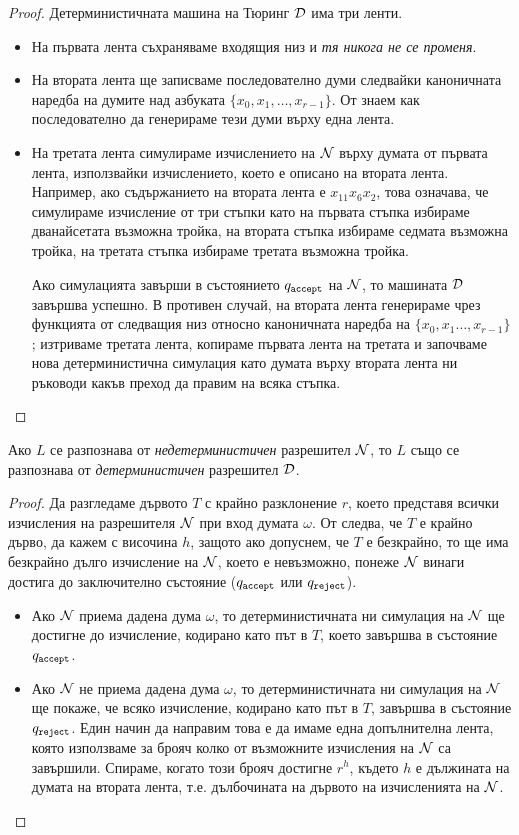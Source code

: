 \begin{proof}
  Детерминистичната машина на Тюринг $\mathcal{D}$ има три ленти.
  \begin{itemize}
  \item 
    На първата лента съхраняваме входящия низ и {\em тя никога не се променя}.
  \item
    На втората лента ще записваме последователно думи следвайки каноничната наредба на 
    думите над азбуката $\{x_0,x_1,\dots,x_{r-1}\}$.
    От  знаем как последователно да генерираме тези думи върху една лента.
  \item
    На третата лента симулираме изчислението на $\mathcal{N}$ върху думата от първата лента, използвайки изчислението, 
    което е описано на втората лента. Например, ако съдържанието на втората лента е $x_{11}x_6x_2$,
    това означава, че симулираме изчисление от три стъпки като на първата стъпка избираме дванайсетата
    възможна тройка, на втората стъпка избираме седмата възможна тройка, на третата стъпка избираме третата възможна тройка.
    
    Ако симулацията завърши в състоянието $q_{\texttt{accept}}$ на $\mathcal{N}$, то машината $\mathcal{D}$ завършва успешно.
    В противен случай, на втората лента генерираме чрез функцията от  следващия низ относно каноничната наредба на $\{x_0,x_1\dots,x_{r-1}\}$;
    изтриваме третата лента, копираме първата лента на третата и започваме нова детерминистична симулация като думата върху втората лента ни ръководи какъв преход да правим на всяка стъпка.
  \end{itemize}
\end{proof}


\begin{corollary}
  Ако $L$ се разпознава от {\em недетерминистичен} разрешител $\mathcal{N}$, то $L$
  също се разпознава от {\em детерминистичен} разрешител $\mathcal{D}$.
\end{corollary}
\begin{proof}
  Да разгледаме дървото $T$ с крайно разклонение $r$, което представя всички изчисления на разрешителя $\mathcal{N}$ при вход думата $\omega$.
  От  следва, че $T$ е крайно дърво, да кажем с височина $h$, защото ако допуснем, че $T$ е безкрайно, то ще има безкрайно дълго изчисление на $\mathcal{N}$,
  което е невъзможно, понеже $\mathcal{N}$ винаги достига до заключително състояние ($q_{\texttt{accept}}$ или $q_{\texttt{reject}}$).
  \begin{itemize}
  \item 
    Ако $\mathcal{N}$ приема дадена дума $\omega$, то детерминистичната ни симулация на $\mathcal{N}$ ще достигне до изчисление, кодирано като път в $T$, 
    което завършва в състояние $q_{\texttt{accept}}$.
  \item
    Ако $\mathcal{N}$ не приема дадена дума $\omega$, то детерминистичната ни симулация на $\mathcal{N}$ ще покаже, че всяко изчисление, кодирано като път в $T$, завършва в състояние $q_{\texttt{reject}}$.
    Един начин да направим това е да имаме една допълнителна лента, която използваме за брояч колко от възможните изчисления на $\mathcal{N}$ са завършили.
    Спираме, когато този брояч достигне $r^h$, където $h$ е дължината на думата на втората лента, т.е. дълбочината на дървото на изчисленията на $\mathcal{N}$.
  \end{itemize}
\end{proof}


